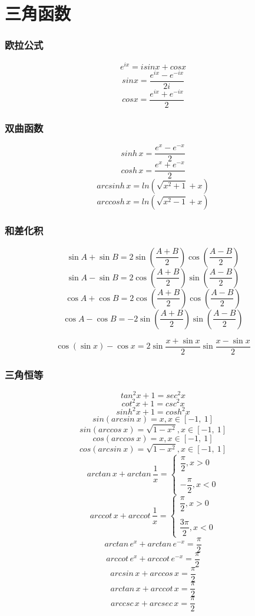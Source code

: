 
\chapter{三角函数}

\subsection{欧拉公式}
\[e^{ix} = isinx + cosx\]
\[sinx = \dfrac{e^{ix} - e^{-ix}}{2i}\]
\[cosx = \dfrac{e^{ix} + e^{-ix}}{2}\]

\subsection{双曲函数}
\[sinh\,x = \dfrac{e^{x} - e^{-x}}{2}\]
\[cosh\,x = \dfrac{e^{x} + e^{-x}}{2}\]
\[arcsinh\,x = ln(\sqrt{x^{2} + 1} + x)\]
\[arccosh\,x = ln(\sqrt{x^{2} - 1} + x)\]


\subsection{和差化积}

\[\sin A+\sin B = 2\sin\left(\frac{A + B}{2}\right)\cos\left(\frac{A - B}{2}\right)\]
\[\sin A-\sin B = 2\cos\left(\frac{A + B}{2}\right)\sin\left(\frac{A - B}{2}\right)\]
\[\cos A + \cos B = 2\cos\left(\frac{A + B}{2}\right)\cos\left(\frac{A - B}{2}\right)\]
\[\cos A - \cos B = -2\sin\left(\frac{A + B}{2}\right)\sin\left(\frac{A - B}{2}\right)\]

\[\cos(\sin x) - \cos x = 2\sin\dfrac{x + \sin x}{2}\sin\dfrac{x - \sin x}{2}\]


\subsection{三角恒等}
\[tan^{2}x + 1 = sec^{2}x\]
\[cot^{2}x + 1 = csc^{2}x\]
\[sinh^{2}x + 1 = cosh^{2}x\]
\[sin(arcsin\ x) = x, x \in [-1,\ 1]\]
\[sin(arccos\ x) = \sqrt{1 - x^2}, x \in [-1,\ 1]\]
\[cos(arccos\ x) = x, x \in [-1,\ 1]\]
\[cos(arcsin\ x) = \sqrt{1 - x^2}, x \in [-1,\ 1]\]
\[arctan\,x + arctan\,\frac{1}{x} = 
\begin{cases}
\dfrac{\pi}{2},x > 0 \\ \\
-\dfrac{\pi}{2}, x < 0
\end{cases}\]
\[arccot\,x + arccot\,\frac{1}{x} = 
\begin{cases}
\dfrac{\pi}{2},x > 0 \\ \\
\dfrac{3\pi}{2}, x < 0
\end{cases}\]
\[arctan\,e^{x} + arctan\,e^{-x} = \dfrac{\pi}{2}\]
\[arccot\,e^{x} + arccot\,e^{-x} = \dfrac{\pi}{2}\]
\[arcsin\,x + arccos\,x = \dfrac{\pi}{2}\]
\[arctan\,x + arccot\,x = \dfrac{\pi}{2}\]
\[arccsc\,x + arcsec\,x = \dfrac{\pi}{2}\]

